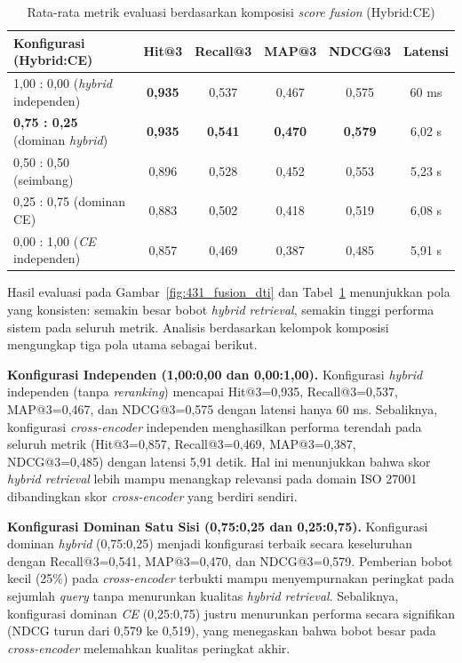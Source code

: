 \begin{table}[H]
	\centering
	\caption{Rata-rata metrik evaluasi berdasarkan komposisi \textit{score fusion} (Hybrid:CE)}
	\label{tbl:431_fusion_dti}
	\small
	\begin{tabular}{lccccc}
		\toprule
		Konfigurasi (Hybrid:CE) & Hit@3 & Recall@3 & MAP@3 & NDCG@3 & Latensi \\
		\midrule
		1{,}00 : 0{,}00 (\textit{hybrid} independen) & \textbf{0{,}935} & 0{,}537 & 0{,}467 & 0{,}575 & 60 ms \\
		\textbf{0{,}75 : 0{,}25} (dominan \textit{hybrid}) & \textbf{0{,}935} & \textbf{0{,}541} & \textbf{0{,}470} & \textbf{0{,}579} & 6{,}02 s \\
		0{,}50 : 0{,}50 (seimbang) & 0{,}896 & 0{,}528 & 0{,}452 & 0{,}553 & 5{,}23 s \\
		0{,}25 : 0{,}75 (dominan CE) & 0{,}883 & 0{,}502 & 0{,}418 & 0{,}519 & 6{,}08 s \\
		0{,}00 : 1{,}00 (\textit{CE} independen) & 0{,}857 & 0{,}469 & 0{,}387 & 0{,}485 & 5{,}91 s \\
		\bottomrule
	\end{tabular}
\end{table}

Hasil evaluasi pada Gambar~\ref{fig:431_fusion_dti} dan Tabel~\ref{tbl:431_fusion_dti} menunjukkan pola yang konsisten: semakin besar bobot \textit{hybrid retrieval}, semakin tinggi performa sistem pada seluruh metrik. Analisis berdasarkan kelompok komposisi mengungkap tiga pola utama sebagai berikut.

\textbf{Konfigurasi Independen (1{,}00:0{,}00 dan 0{,}00:1{,}00).} Konfigurasi \textit{hybrid} independen (tanpa \textit{reranking}) mencapai Hit@3=0{,}935, Recall@3=0{,}537, MAP@3=0{,}467, dan NDCG@3=0{,}575 dengan latensi hanya 60 ms. Sebaliknya, konfigurasi \textit{cross-encoder} independen menghasilkan performa terendah pada seluruh metrik (Hit@3=0{,}857, Recall@3=0{,}469, MAP@3=0{,}387, NDCG@3=0{,}485) dengan latensi 5{,}91 detik. Hal ini menunjukkan bahwa skor \textit{hybrid retrieval} lebih mampu menangkap relevansi pada domain ISO 27001 dibandingkan skor \textit{cross-encoder} yang berdiri sendiri.

\textbf{Konfigurasi Dominan Satu Sisi (0{,}75:0{,}25 dan 0{,}25:0{,}75).} Konfigurasi dominan \textit{hybrid} (0{,}75:0{,}25) menjadi konfigurasi terbaik secara keseluruhan dengan Recall@3=0{,}541, MAP@3=0{,}470, dan NDCG@3=0{,}579. Pemberian bobot kecil (25\%) pada \textit{cross-encoder} terbukti mampu menyempurnakan peringkat pada sejumlah \textit{query} tanpa menurunkan kualitas \textit{hybrid retrieval}. Sebaliknya, konfigurasi dominan \textit{CE} (0{,}25:0{,}75) justru menurunkan performa secara signifikan (NDCG turun dari 0{,}579 ke 0{,}519), yang menegaskan bahwa bobot besar pada \textit{cross-encoder} melemahkan kualitas peringkat akhir.

